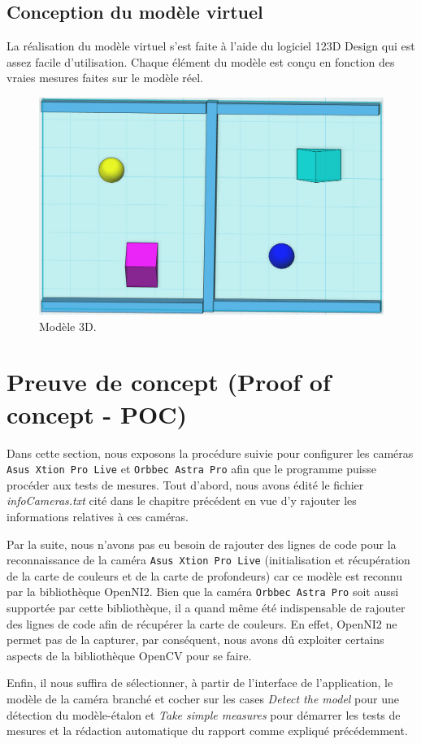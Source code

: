 \documentclass[a4paper, 12pt]{book}
\newcounter{program}[subsection]
\begin{document}
\subsection{Conception du modèle virtuel}
La réalisation du modèle virtuel s'est faite à l'aide du logiciel 123D Design qui est assez facile d'utilisation. Chaque élément du modèle est conçu en fonction des vraies mesures faites sur le modèle réel.
\begin{center}
	\begin{figure}[htbp]
  		\hspace{0.37cm}
 		\includegraphics[scale=0.35]{images/3DModel.png} \hspace{2cm}
  		\caption{Modèle 3D.\label{fig-3Dmodel}}
	\end{figure}
\end{center}

\section{Preuve de concept (Proof of concept - POC)}
Dans cette section, nous exposons la procédure suivie pour configurer les caméras \texttt{Asus Xtion Pro Live} et \texttt{Orbbec Astra Pro} afin que le programme puisse procéder aux tests de mesures.
Tout d'abord, nous avons édité le fichier \emph{infoCameras.txt} cité dans le chapitre précédent en vue d'y rajouter les informations relatives à ces caméras.
\par Par la suite, nous n'avons pas eu besoin de rajouter des lignes de code pour la reconnaissance de la caméra \texttt{Asus Xtion Pro Live} (initialisation et récupération de la carte de couleurs et de la carte de profondeurs) car ce modèle est reconnu par la bibliothèque OpenNI2. Bien que la caméra \texttt{Orbbec Astra Pro} soit aussi supportée par cette bibliothèque, il a quand même été indispensable de rajouter des lignes de code afin de récupérer la carte de couleurs. En effet, OpenNI2 ne permet pas de la capturer, par conséquent, nous avons dû exploiter certains aspects de la bibliothèque OpenCV pour se faire.
\par Enfin, il nous suffira de sélectionner, à partir de l'interface de l'application, le modèle de la caméra branché et cocher sur les cases \emph{Detect the model} pour une détection du modèle-étalon et \emph{Take simple measures} pour démarrer les tests de mesures et la rédaction automatique du rapport comme expliqué précédemment. 
\end{document}
